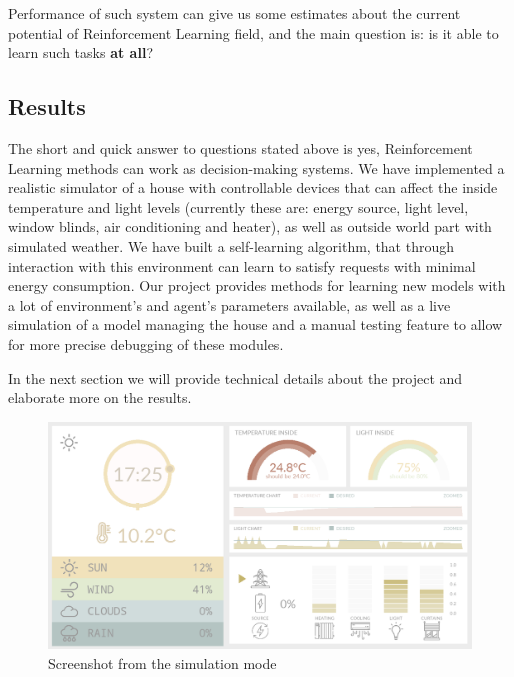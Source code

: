 \documentclass{article}
\begin{document}
Performance of such system can give us some estimates about the current potential of Reinforcement Learning field, and the main question is: is it able to learn such tasks \textbf{at all}?

\subsection{Results}
The short and quick answer to questions stated above is yes, Reinforcement Learning methods can work as decision-making systems. We have implemented a realistic simulator of a house with controllable devices that can affect the inside temperature and light levels (currently these are: energy source, light level, window blinds, air conditioning and heater), as well as outside world part with simulated weather. We have built a self-learning algorithm, that through interaction with this environment can learn to satisfy requests with minimal energy consumption. Our project provides methods for learning new models with a lot of environment's and agent's parameters available, as well as a live simulation of a model managing the house and a manual testing feature to allow for more precise debugging of these modules.

In the next section we will provide technical details about the project and elaborate more on the results.


\begin{figure}[H]
    \begin{center}
        \includegraphics[scale=0.5]{screen.png}
        \caption{Screenshot from the simulation mode}
    \end{center}
\end{figure}
\end{document}
